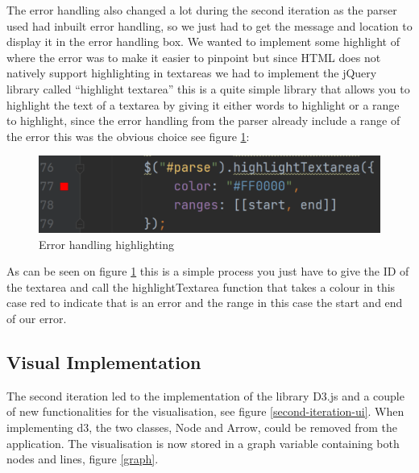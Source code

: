 \bigskip
The error handling also changed a lot during the second iteration as the parser used had inbuilt error handling, so we just had to get the message and location to display it in the error handling box. We wanted to implement some highlight of where the error was to make it easier to pinpoint but since HTML does not natively support highlighting in textareas we had to implement the jQuery library called “highlight textarea” this is a quite simple library that allows you to highlight the text of a textarea by giving it either words to highlight or a range to highlight, since the error handling from the parser already include a range of the error this was the obvious choice see figure \ref{fig:errorhandling}:
\begin{figure}[H]
    \centering
    \includegraphics[width=1\textwidth]{figures/errorhandling.pdf}
    \caption{Error handling highlighting}
    \label{fig:errorhandling}
\end{figure}
As can be seen on figure \ref{fig:errorhandling} this is a simple process you just have to give the ID of the textarea and call the highlightTextarea function that takes a colour in this case red to indicate that is an error and the range in this case the start and end of our error.

\subsection{Visual Implementation}
The second iteration led to the implementation of the library D3.js and a couple of new functionalities for the visualisation, see figure \ref{second-iteration-ui}. When implementing d3, the two classes, Node and Arrow, could be removed from the application. The visualisation is now stored in a graph variable containing both nodes and lines, figure \ref{graph}.

